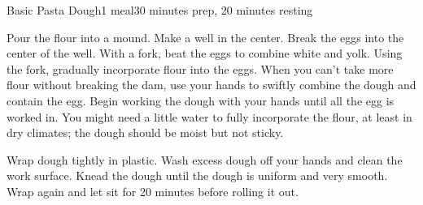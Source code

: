 \documentclass[../Cookbook.tex]{subfiles}
\begin{document}
\begin{recipe}{Basic Pasta Dough}{1 meal}{30 minutes prep, 20 minutes resting}

Pour the flour into a mound. Make a well in the center. Break the eggs into the center of the well.
With a fork, beat the eggs to combine white and yolk. Using the fork, gradually incorporate flour into the eggs.
When you can't take more flour without breaking the dam, use your hands to swiftly combine the dough and contain the egg.
Begin working the dough with your hands until all the egg is worked in.
You might need a little water to fully incorporate the flour, at least in dry climates; the dough should be moist but not sticky.

\newstep
Wrap dough tightly in plastic. Wash excess dough off your hands and clean the work surface. Knead the dough until the dough is uniform and very smooth. Wrap again and let sit for 20 minutes before rolling it out.

\end{recipe}
\end{document}
